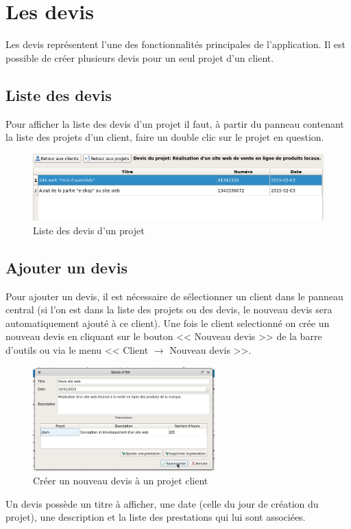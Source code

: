 \chapter{Les devis}
Les devis représentent l'une des fonctionnalités principales de l'application. Il est possible de créer plusieurs devis pour un seul projet d'un client. 
\section{Liste des devis}
Pour afficher la liste des devis d'un projet il faut, à partir du panneau contenant la liste des projets d'un client, faire un double clic sur le projet en question.
\begin{figure}[H]
	\centering
	\includegraphics[width=12cm]{screens/ihmDevis.png}
	\caption{Liste des devis d'un projet}
\end{figure}

\section{Ajouter un devis}
Pour ajouter un devis, il est nécessaire de sélectionner un client dans le panneau central (si l'on est dans la liste des projets ou des devis, le nouveau devis sera automatiquement ajouté à ce client). Une fois le client selectionné on crée un nouveau devis en cliquant sur le bouton << Nouveau devis >> de la barre d'outils ou via le menu << Client $\rightarrow$ Nouveau devis >>. 
\begin{figure}[H]
	\centering
	\includegraphics[width=7cm]{screens/creerDevis.png}
	\caption{Créer un nouveau devis à un projet client}
\end{figure}
Un devis possède un titre à afficher, une date (celle du jour de création du projet), une description et la liste des prestations qui lui sont associées. 
